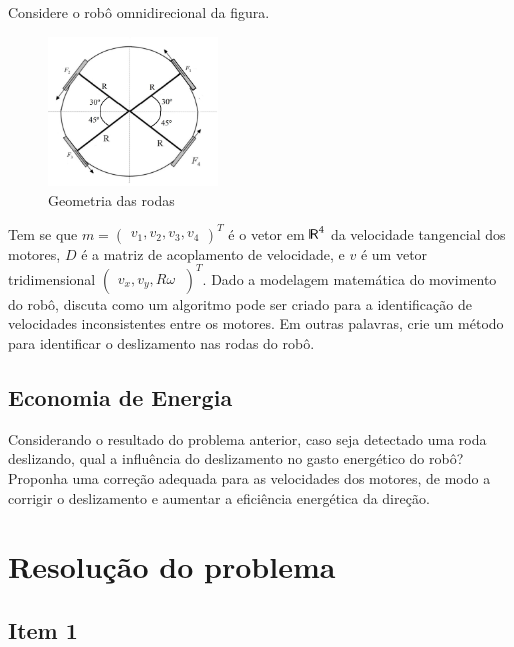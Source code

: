 \documentclass{article}
\def\bkRsf{{\sf \mbox{\vrule height0.705em width0.06em
            depth0em}\kern-.04em R}}
\begin{document}
\hspace{1cm}Considere o robô omnidirecional da figura.

\begin{figure}[H]
\centering
\includegraphics[width=0.4\textwidth]{sanhaco.jpg}
\caption{Geometria das rodas}
\label{Figura 1}
\end{figure}

Tem se que $m=\begin{pmatrix}v_{1},v_{2},v_{3},v_{4} \end{pmatrix}^T$ é o vetor em $\bkRsf^4$ da velocidade tangencial dos motores, $D$ é a matriz de acoplamento de velocidade, e $v$  é um vetor tridimensional $\begin{pmatrix}v_{x},v_{y},R{\omega}\ \end{pmatrix}^T$.
Dado a modelagem matemática do movimento do robô, discuta como um algoritmo pode ser criado para a identificação de velocidades inconsistentes entre os motores. Em outras palavras, crie um método para identificar o  deslizamento nas rodas do robô.

\subsection{Economia de Energia}

\hspace{1cm}Considerando o resultado do problema anterior, caso seja detectado uma roda deslizando, qual a influência do deslizamento no gasto energético do robô? Proponha uma correção adequada para as velocidades dos motores, de modo a corrigir o deslizamento e aumentar a eficiência energética da direção.

\section{Resolução do problema}
\subsection{Item 1}
\end{document}
